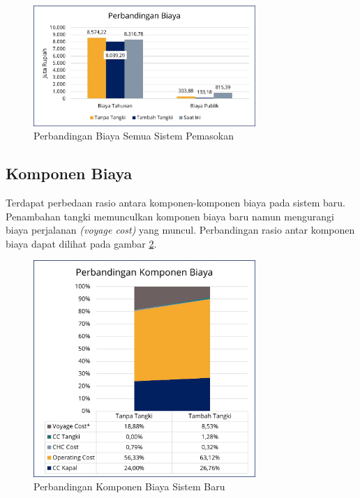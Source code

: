 \begin{figure}[!ht]
    \centering
    \includegraphics[width=0.75\textwidth]{grafik/total-cost-all.jpg}
    \caption{Perbandingan Biaya Semua Sistem Pemasokan}
    \label{fig:total-cost-all}
\end{figure}

\subsection{Komponen Biaya}
\label{subsec:component-cost-all}

Terdapat perbedaan rasio antara komponen-komponen biaya pada sistem baru. Penambahan tangki memunculkan komponen biaya baru namun mengurangi biaya perjalanan \emph{(voyage cost)} yang muncul. Perbandingan rasio antar komponen biaya dapat dilihat pada gambar \ref{fig:component-cost-all}.

\begin{figure}[!ht]
    \centering
    \includegraphics[width=0.75\textwidth]{grafik/element-cost-new.jpg}
    \caption{Perbandingan Komponen Biaya Sistem Baru}
    \label{fig:component-cost-all}
\end{figure}